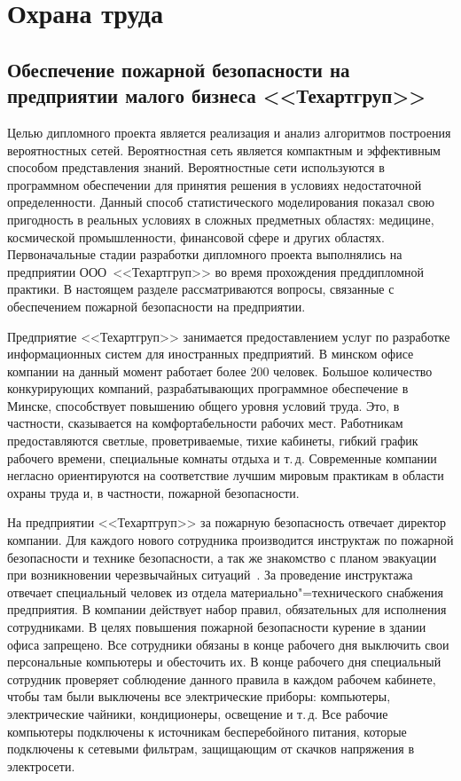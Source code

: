 \newcommand{\companyname}{\mbox{<<Техартгруп>>}}

\section{Охрана труда}

\subsection[Обеспечение пожарной безопасности на предприятии]{Обеспечение пожарной безопасности на предприятии малого бизнеса \companyname{}}


Целью дипломного проекта является реализация и анализ алгоритмов построения вероятностных сетей.
Вероятностная сеть является компактным и эффективным способом представления знаний.
Вероятностные сети используются в программном обеспечении для принятия решения в условиях недостаточной определенности.
Данный способ статистического моделирования показал свою пригодность в реальных условиях в сложных предметных областях: медицине, космической промышленности, финансовой сфере и других областях.
Первоначальные стадии разработки дипломного проекта выполнялись на предприятии ООО~\companyname{} во время прохождения преддипломной практики.
В настоящем разделе рассматриваются вопросы, связанные с обеспечением пожарной безопасности на предприятии.

Предприятие \companyname{} занимается предоставлением услуг по разработке информационных систем для иностранных предприятий.
В минском офисе компании на данный момент работает более 200 человек.
Большое количество конкурирующих компаний, разрабатывающих программное обеспечение в Минске, способствует повышению общего уровня условий труда.
Это, в частности, сказывается на комфортабельности рабочих мест.
Работникам предоставляются светлые, проветриваемые, тихие кабинеты, гибкий график рабочего времени, специальные комнаты отдыха и т.\,д.
Современные компании негласно ориентируются на соответствие лучшим мировым практикам в области охраны труда и, в частности, пожарной безопасности.

На предприятии \companyname{} за пожарную безопасность отвечает директор компании.
Для каждого нового сотрудника производится инструктаж по пожарной безопасности и технике безопасности, а так же знакомство с планом эвакуации при возникновении черезвычайных ситуаций~\cite[\ignore{раздел~5.5.8,} с.~324]{michnuk_2009}.
За проведение инструктажа отвечает специальный человек из отдела материально"=технического снабжения предприятия.
В компании действует набор правил, обязательных для исполнения сотрудниками.
В целях повышения пожарной безопасности курение в здании офиса запрещено.
Все сотрудники обязаны в конце рабочего дня выключить свои персональные компьютеры и обесточить их.
В конце рабочего дня специальный сотрудник проверяет соблюдение данного правила в каждом рабочем кабинете, чтобы там были выключены все электрические приборы: компьютеры, электрические чайники, кондиционеры, освещение и т.\,д.
Все рабочие компьютеры подключены к источникам бесперебойного питания, которые подключены к сетевыми фильтрам, защищающим от скачков напряжения в электросети.

